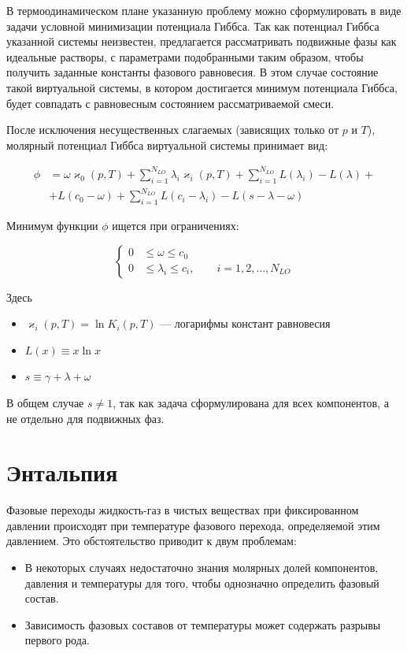 \documentclass[12pt]{article}
\renewcommand{\leq}{\leqslant}
\begin{document}
В термоодинамическом плане указанную проблему можно сформулировать в виде задачи условной минимизации потенциала Гиббса. Так как потенциал Гиббса указанной системы неизвестен, предлагается рассматривать подвижные фазы как идеальные растворы, с параметрами подобранными таким образом, чтобы получить заданные константы фазового равновесия. В этом случае состояние такой виртуальной системы, в котором достигается минимум потенциала Гиббса, будет совпадать с равновесным состоянием рассматриваемой смеси.

После исключения несущественных слагаемых (зависящих только от $p$ и $T$), молярный потенциал Гиббса виртуальной системы принимает вид:

\begin{equation}
\begin{aligned}
{\phi} &= \omega \varkappa_0(p,T) + \sum_{i=1}^{N_{LO}} \lambda_i \varkappa_i(p,T) + \sum_{i=1}^{N_{LO}} L(\lambda_i) - L(\lambda) + \\
&+ L(c_0 - \omega) + \sum_{i=1}^{N_{LO}} L(c_i - \lambda_i) - L(s - \lambda - \omega)
\end{aligned}
\label{eq:pproblem}
\end{equation}

Минимум функции $\phi$ ищется при ограничениях:

\begin{equation}
\left\{
\begin{aligned}
0& \leq \omega \leq c_0\\
0& \leq \lambda_i \leq c_i, \qquad i = 1,2,\dots,N_{LO}
\end{aligned}
\right. \label{eq:restr}
\end{equation}

Здесь
\begin{itemize}
\item $\varkappa_i(p, T) = \ln K_i(p, T)$ --- логарифмы констант равновесия \item $L(x) \equiv x \ln x$ \item $s \equiv \gamma + \lambda + \omega$
\end{itemize}

В общем случае $s \ne 1$, так как задача сформулирована для всех компонентов, а не отдельно для подвижных фаз.



\section{Энтальпия}
Фазовые переходы жидкость-газ в чистых веществах при фиксированном давлении происходят при температуре фазового перехода, определяемой этим давлением. Это обстоятельство приводит к двум проблемам:
\begin{itemize}
\item В некоторых случаях недостаточно знания молярных долей компонентов, давления и температуры для того, чтобы однозначно определить фазовый состав.
\item Зависимость фазовых составов от температуры может содержать разрывы первого рода.
\end{itemize}
\end{document}
